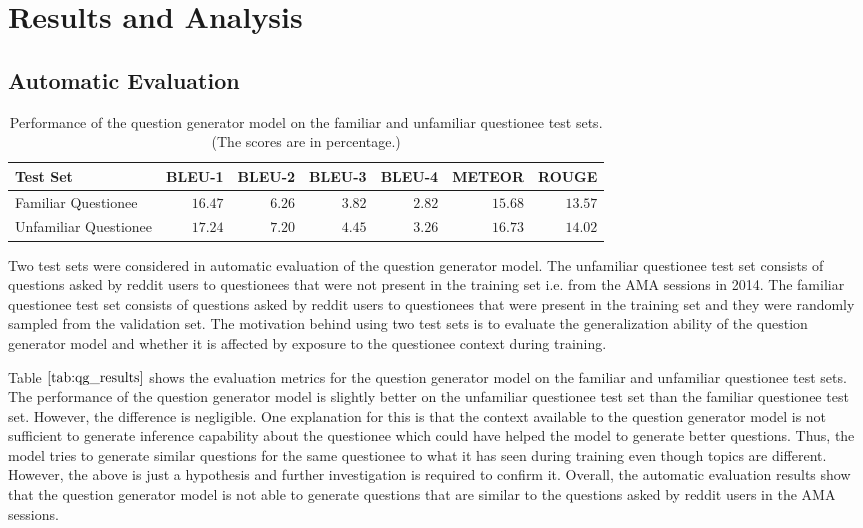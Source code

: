 \documentclass[paper=a4, fontsize=11pt]{scrartcl}
\numberwithin{equation}{section}		%
\numberwithin{figure}{section}			%
\numberwithin{table}{section}				%
\begin{document}
\section{Results and Analysis}

\subsection*{Automatic Evaluation}

\begin{table}
  \footnotesize
  \centering
  \begin{tabular}{lrrrrrr}
    \hline
    Test Set & BLEU-1 & BLEU-2 & BLEU-3 & BLEU-4 & METEOR & ROUGE \\
    \hline
    Familiar Questionee & $16.47$ & $6.26$ & $3.82$ & $2.82$ & $15.68$ & $13.57$ \\
    Unfamiliar Questionee & $17.24$ & $7.20$ & $4.45$ & $3.26$ & $16.73$ & $14.02$ \\
    \hline
  \end{tabular}
  \caption{Performance of the question generator model on the familiar and unfamiliar questionee test sets. (The scores are in percentage.)}
  \label{tab:qg_results}
\end{table}

Two test sets were considered in automatic evaluation of the question generator model.
The unfamiliar questionee test set consists of questions asked by reddit users to questionees that were not present in the training set i.e. from the AMA sessions in 2014.
The familiar questionee test set consists of questions asked by reddit users to questionees that were present in the training set and they were randomly sampled from the validation set.
The motivation behind using two test sets is to evaluate the generalization ability of the question generator model and whether it is affected by exposure to the questionee context during training.

Table $\ref{tab:qg_results}$ shows the evaluation metrics for the question generator model on the familiar and unfamiliar questionee test sets. 
The performance of the question generator model is slightly better on the unfamiliar questionee test set than the familiar questionee test set.
However, the difference is negligible.
One explanation for this is that the context available to the question generator model is not sufficient to generate inference capability about the questionee which could have helped the model to generate better questions.
Thus, the model tries to generate similar questions for the same questionee to what it has seen during training even though topics are different.
However, the above is just a hypothesis and further investigation is required to confirm it.
Overall, the automatic evaluation results show that the question generator model is not able to generate questions that are similar to the questions asked by reddit users in the AMA sessions.
\end{document}
